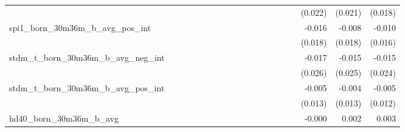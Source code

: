 \begin{tabular}{lrrrrrrrrrrrrrrrrrr}
                                            &              &              &              &              &              &              &              &              &               &              &              &               &              &              &               &      (0.022) &      (0.021) &       (0.018) \\ 
spi1\_born\_30m36m\_b\_avg\_pos\_int        &              &              &              &              &              &              &              &              &               &              &              &               &              &              &               &       -0.016 &       -0.008 &        -0.010 \\ 
                                            &              &              &              &              &              &              &              &              &               &              &              &               &              &              &               &      (0.018) &      (0.018) &       (0.016) \\ 
stdm\_t\_born\_30m36m\_b\_avg\_neg\_int     &              &              &              &              &              &              &              &              &               &              &              &               &              &              &               &       -0.017 &       -0.015 &        -0.015 \\ 
                                            &              &              &              &              &              &              &              &              &               &              &              &               &              &              &               &      (0.026) &      (0.025) &       (0.024) \\ 
stdm\_t\_born\_30m36m\_b\_avg\_pos\_int     &              &              &              &              &              &              &              &              &               &              &              &               &              &              &               &       -0.005 &       -0.004 &        -0.005 \\ 
                                            &              &              &              &              &              &              &              &              &               &              &              &               &              &              &               &      (0.013) &      (0.013) &       (0.012) \\ 
hd40\_born\_30m36m\_b\_avg                  &              &              &              &              &              &              &              &              &               &              &              &               &              &              &               &       -0.000 &        0.002 &         0.003 \\ 

\end{tabular}
